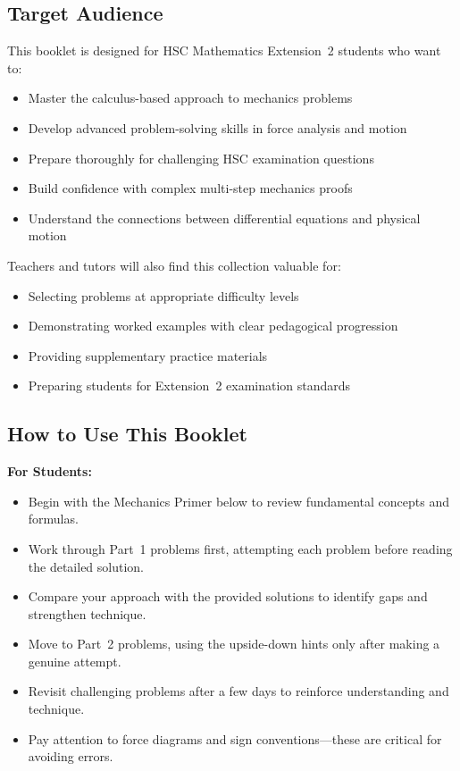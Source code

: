 \documentclass[12pt]{article}
\begin{document}
\subsection{Target Audience}
This booklet is designed for HSC Mathematics Extension~2 students who want to:
\begin{itemize}[leftmargin=*]
  \item Master the calculus-based approach to mechanics problems
  \item Develop advanced problem-solving skills in force analysis and motion
  \item Prepare thoroughly for challenging HSC examination questions
  \item Build confidence with complex multi-step mechanics proofs
  \item Understand the connections between differential equations and physical motion
\end{itemize}

Teachers and tutors will also find this collection valuable for:
\begin{itemize}[leftmargin=*]
  \item Selecting problems at appropriate difficulty levels
  \item Demonstrating worked examples with clear pedagogical progression
  \item Providing supplementary practice materials
  \item Preparing students for Extension~2 examination standards
\end{itemize}

\subsection{How to Use This Booklet}
\textbf{For Students:}
\begin{itemize}[leftmargin=*]
  \item Begin with the Mechanics Primer below to review fundamental concepts and formulas.
  \item Work through Part~1 problems first, attempting each problem before reading the detailed solution.
  \item Compare your approach with the provided solutions to identify gaps and strengthen technique.
  \item Move to Part~2 problems, using the upside-down hints only after making a genuine attempt.
  \item Revisit challenging problems after a few days to reinforce understanding and technique.
  \item Pay attention to force diagrams and sign conventions---these are critical for avoiding errors.
\end{itemize}
\end{document}
